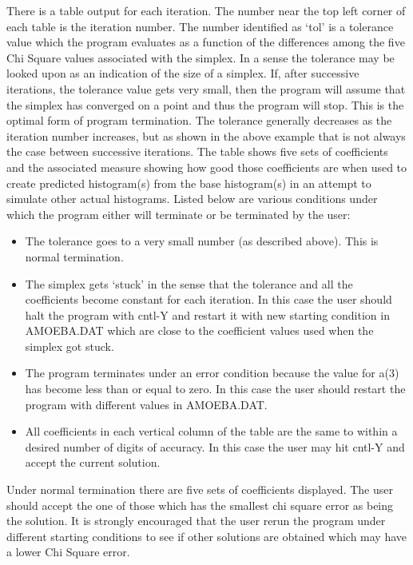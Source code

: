       There is a table output for each iteration.  The number near the
   top left corner of each table is the iteration number.  The number
   identified as `tol' is a tolerance value which the program evaluates as
   a function of the differences among the five Chi Square values
   associated with the simplex.  In a sense the tolerance may be looked
   upon as an indication of the size of a simplex.  If, after successive
   iterations, the tolerance value gets very small, then the program will
   assume that the simplex has converged on a point and thus the program
   will stop.  This is the optimal form of program termination.  The
   tolerance generally decreases as the iteration number increases, but as
   shown in the above example that is not always the case between
   successive iterations.  The table shows five sets of coefficients and
   the associated measure showing how good those coefficients are when
   used to create predicted histogram(s) from the base histogram(s) in an
   attempt to simulate other actual histograms.
       Listed below are various conditions under which the program either
   will terminate or be terminated by the user:
\begin{itemize}
         \item  The tolerance goes to a very small number (as described
                above).  This is normal termination.
         \item  The simplex gets `stuck' in the sense that the tolerance
                and all the coefficients become constant for each
                iteration.  In this case the user should halt the
                program with cntl-Y and restart it with new starting
                condition in AMOEBA.DAT which are close to the coefficient
                values used when the simplex got stuck.
         \item  The program terminates under an error condition because
                the value for a(3) has become less than or equal to
                zero.  In this case the user should restart the program
                with different values in AMOEBA.DAT.
         \item  All coefficients in each vertical column of the table
                are the same to within a desired number of digits of
                accuracy.  In this case the user may hit cntl-Y and
                accept the current solution.
\end{itemize}

       Under normal termination there are five sets of coefficients
   displayed.  The user should accept the one of those which has the
   smallest chi square error as being the solution.  It is strongly
   encouraged that the user rerun the program under different starting
   conditions to see if other solutions are obtained which may have a
   lower Chi Square error.

